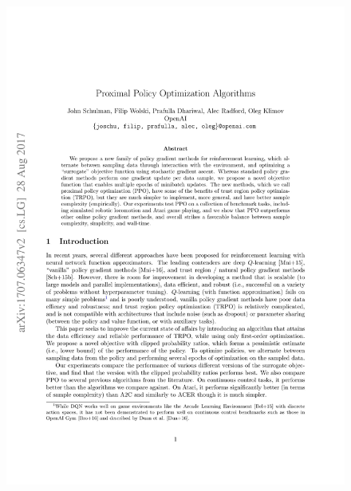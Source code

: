 \documentclass[bachelor]{thesis-uestc}
\begin{document}
	\begin{figure}[h]
		\includegraphics[width=13cm]{./pic/ProximalPolicyOptimizationAlgorithms-01.jpg}
	\end{figure}
\end{document}
